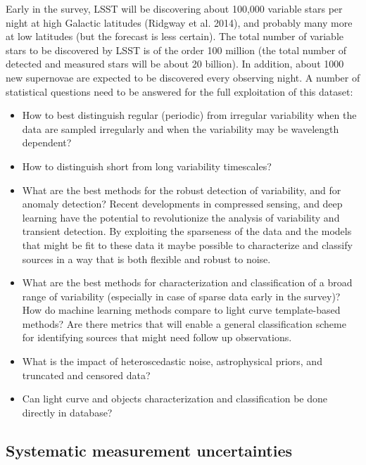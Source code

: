 \documentclass{iau}
\begin{document}
Early in the survey, LSST will be discovering about 100,000 variable
stars per night at high Galactic latitudes (Ridgway et al. 2014), and
probably many more at low latitudes (but the forecast is less
certain). The total number of variable stars to be discovered by LSST
is of the order 100 million (the total number of detected and measured
stars will be about 20 billion). In addition, about 1000 new
supernovae are expected to be discovered every observing night. A
number of statistical questions need to be answered for the full
exploitation of this dataset:
\begin{itemize}
\item How to best distinguish regular (periodic) from irregular
  variability when the data are sampled irregularly and when the
  variability may be wavelength dependent? 
\item How to distinguish short from long variability timescales? 
\item What are the best methods for the robust detection of
  variability, and for anomaly detection?  Recent developments in
  compressed sensing, and deep learning have the potential to
  revolutionize the analysis of variability and transient
  detection. By exploiting the sparseness of the data and the models
  that might be fit to these data it maybe possible to characterize
  and classify sources in a way that is both flexible and robust to
  noise.
\item What are the best methods for characterization and
  classification of a broad range of variability (especially in case
  of sparse data early in the survey)? How do machine learning methods
  compare to light curve template-based methods?  Are there metrics that will
  enable a general classification scheme for identifying sources that
  might need follow up observations.
\item What is the impact of heteroscedastic noise, astrophysical
  priors, and truncated and censored data?
\item Can light curve and objects characterization and classification be done directly in database?  
\end{itemize}



\subsection{Systematic measurement uncertainties}
\end{document}
